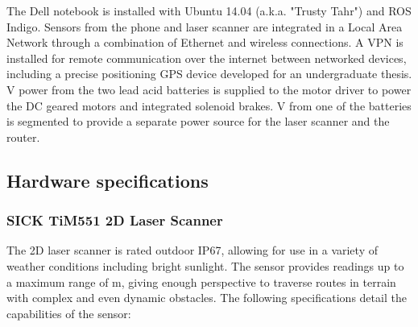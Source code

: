 \documentclass[titlepage,12pt,a4paper]{article}
\begin{document}
The Dell notebook is installed with Ubuntu 14.04 (a.k.a. "Trusty Tahr") and ROS Indigo. Sensors from the phone and laser scanner are integrated in a Local Area Network through a combination of Ethernet and wireless connections. A VPN is installed for remote communication over the internet between networked devices, including a precise positioning GPS device developed for an undergraduate thesis. \unit[24]{V} power from the two lead acid batteries is supplied to the motor driver to power the DC geared motors and integrated solenoid brakes. \unit[12]{V} from one of the batteries is segmented to provide a separate power source for the laser scanner and the router.

\subsection{Hardware specifications}
\subsubsection{SICK TiM551 2D Laser Scanner}




The 2D laser scanner is rated outdoor IP67, allowing for use in a variety of weather conditions including bright sunlight. The sensor provides readings up to a maximum range of \unit[10]{m}, giving enough perspective to traverse routes in terrain with complex and even dynamic obstacles. The following specifications detail the capabilities of the sensor: 
\end{document}
